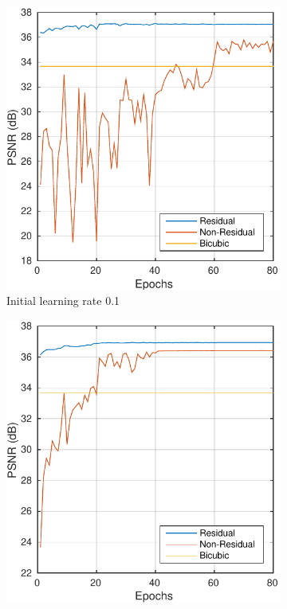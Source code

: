 \documentclass[10pt,twocolumn,letterpaper]{article}
\begin{document}
\begin{figure}[t]
\vspace{-.3cm}
	\centering
	\begin{subfigure}{0.3\textwidth}
		\includegraphics[width=\textwidth]{figs/residual_exp0}
		\caption{Initial learning rate 0.1}
		\label{fig:gull}
	\end{subfigure}%
	\hfill
	\begin{subfigure}{0.3\textwidth}
		\includegraphics[width=\textwidth]{figs/residual_exp1}

\end{subfigure}
\end{figure}
\end{document}
